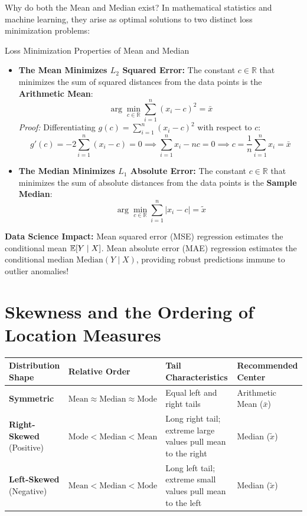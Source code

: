 Why do both the Mean and Median exist? In mathematical statistics and machine learning, they arise as optimal solutions to two distinct loss minimization problems:

\begin{theorembox}{Loss Minimization Properties of Mean and Median}
\begin{itemize}
    \item \textbf{The Mean Minimizes $L_2$ Squared Error:} The constant $c \in \mathbb{R}$ that minimizes the sum of squared distances from the data points is the \textbf{Arithmetic Mean}:
    $$\arg\min_{c \in \mathbb{R}} \sum_{i=1}^n (x_i - c)^2 = \bar{x}$$
    \textit{Proof:} Differentiating $g(c) = \sum_{i=1}^n (x_i - c)^2$ with respect to $c$:
    $$g'(c) = -2\sum_{i=1}^n (x_i - c) = 0 \implies \sum_{i=1}^n x_i - n c = 0 \implies c = \frac{1}{n}\sum_{i=1}^n x_i = \bar{x}$$
    \item \textbf{The Median Minimizes $L_1$ Absolute Error:} The constant $c \in \mathbb{R}$ that minimizes the sum of absolute distances from the data points is the \textbf{Sample Median}:
    $$\arg\min_{c \in \mathbb{R}} \sum_{i=1}^n |x_i - c| = \tilde{x}$$
\end{itemize}
\textbf{Data Science Impact:} Mean squared error (MSE) regression estimates the conditional mean $\mathbb{E}[Y \mid X]$. Mean absolute error (MAE) regression estimates the conditional median $\text{Median}(Y \mid X)$, providing robust predictions immune to outlier anomalies!
\end{theorembox}

\section{Skewness and the Ordering of Location Measures}

\begin{center}
\renewcommand{\arraystretch}{1.3}
\begin{tabular}{p{3.2cm}p{3.5cm}p{4.2cm}p{3.0cm}}
\toprule
\textbf{Distribution Shape} & \textbf{Relative Order} & \textbf{Tail Characteristics} & \textbf{Recommended Center} \\
\midrule
\textbf{Symmetric} & $\text{Mean} \approx \text{Median} \approx \text{Mode}$ & Equal left and right tails & Arithmetic Mean ($\bar{x}$) \\
\textbf{Right-Skewed} (Positive) & $\text{Mode} < \text{Median} < \text{Mean}$ & Long right tail; extreme large values pull mean to the right & Median ($\tilde{x}$) \\
\textbf{Left-Skewed} (Negative) & $\text{Mean} < \text{Median} < \text{Mode}$ & Long left tail; extreme small values pull mean to the left & Median ($\tilde{x}$) \\
\bottomrule
\end{tabular}
\end{center}

